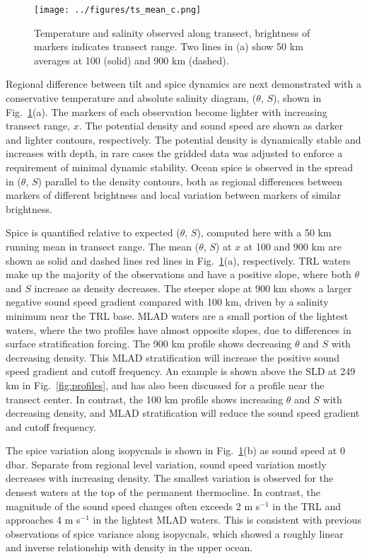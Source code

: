 \documentclass[preprint,NumberedRefs]{JASA}
\begin{document}
\begin{figure}
\texttt{[image: ../figures/ts\_mean\_c.png]}
    \caption{\label{fig:ts_diagram}{Temperature and salinity observed along transect, brightness of markers indicates transect range. Two lines in (a) show 50 km averages at 100 (solid) and 900 km (dashed).}}
\end{figure}
Regional difference between tilt and spice dynamics are next demonstrated with a conservative temperature and absolute salinity diagram,\cite{TEOS10} ($\theta$, $S$), shown in Fig.~\ref{fig:ts_diagram}(a). The markers of each observation become lighter with increasing transect range, $x$. The potential density and sound speed are shown as darker and lighter contours, respectively. The potential density is dynamically stable and increases with depth, in rare cases the gridded data was adjusted to enforce a requirement of minimal dynamic stability.\citep{barker2017stabilizing} Ocean spice is observed in the spread in ($\theta$, $S$) parallel to the density contours, both as regional differences between markers of different brightness and local variation between markers of similar brightness.

Spice is quantified relative to expected ($\theta$, $S$), computed here with a 50 km running mean in transect range. The mean ($\theta$, $S$) at $x$ at 100 and 900 km are shown as solid and dashed lines red lines in Fig.~\ref{fig:ts_diagram}(a), respectively. TRL waters make up the majority of the observations and have a positive slope, where both $\theta$ and $S$ increase as density decreases. The steeper slope at 900 km shows a larger negative sound speed gradient compared with 100 km, driven by a salinity minimum near the TRL base. MLAD waters are a small portion of the lightest waters, where the two profiles have almost opposite slopes, due to differences in surface stratification forcing.\cite{colosi2020observations} The 900 km profile shows decreasing $\theta$ and $S$ with decreasing density. This MLAD stratification will increase the positive sound speed gradient and cutoff frequency. An example is shown above the SLD at 249 km in Fig.~\ref{fig:profiles}, and has also been discussed for a profile near the transect center.\cite{colosi2020observations} In contrast, the 100 km profile shows increasing $\theta$ and $S$ with decreasing density, and MLAD stratification will reduce the sound speed gradient and cutoff frequency.

The spice variation along isopycnals is shown in Fig.~\ref{fig:ts_diagram}(b) as sound speed at 0 dbar. Separate from regional level variation, sound speed variation mostly decreases with increasing density. The smallest variation is observed for the densest waters at the top of the permanent thermocline.\cite{cole2010seasonal} In contrast, the magnitude of the sound speed changes often exceeds 2 m s$^{-1}$ in the TRL and approaches 4 m s$^{-1}$ in the lightest MLAD waters. This is consistent with previous observations of spice variance along isopycnals, which showed a roughly linear and inverse relationship with density in the upper ocean.\cite{ferrari2000}
\end{document}
